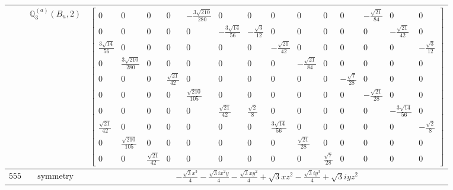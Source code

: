 \documentclass[fleqn,8pt,landscape]{jsarticle}
\begin{document}
\begin{longtable}{ccc}
$  $ & $ \mathbb{Q}_{3}^{(a)}(B_{u},2) $ & $ \begin{bmatrix} 0 & 0 & 0 & 0 & - \frac{3 \sqrt{210}}{280} & 0 & 0 & 0 & 0 & 0 & 0 & - \frac{\sqrt{21}}{84} & 0 & 0 \\ 0 & 0 & 0 & 0 & 0 & - \frac{3 \sqrt{14}}{56} & - \frac{\sqrt{3}}{12} & 0 & 0 & 0 & 0 & 0 & - \frac{\sqrt{21}}{42} & 0 \\ \frac{3 \sqrt{14}}{56} & 0 & 0 & 0 & 0 & 0 & 0 & - \frac{\sqrt{21}}{42} & 0 & 0 & 0 & 0 & 0 & - \frac{\sqrt{3}}{12} \\ 0 & \frac{3 \sqrt{210}}{280} & 0 & 0 & 0 & 0 & 0 & 0 & - \frac{\sqrt{21}}{84} & 0 & 0 & 0 & 0 & 0 \\ 0 & 0 & 0 & \frac{\sqrt{21}}{42} & 0 & 0 & 0 & 0 & 0 & 0 & - \frac{\sqrt{7}}{28} & 0 & 0 & 0 \\ 0 & 0 & 0 & 0 & \frac{\sqrt{210}}{105} & 0 & 0 & 0 & 0 & 0 & 0 & - \frac{\sqrt{21}}{28} & 0 & 0 \\ 0 & 0 & 0 & 0 & 0 & \frac{\sqrt{21}}{42} & \frac{\sqrt{2}}{8} & 0 & 0 & 0 & 0 & 0 & - \frac{3 \sqrt{14}}{56} & 0 \\ \frac{\sqrt{21}}{42} & 0 & 0 & 0 & 0 & 0 & 0 & \frac{3 \sqrt{14}}{56} & 0 & 0 & 0 & 0 & 0 & - \frac{\sqrt{2}}{8} \\ 0 & \frac{\sqrt{210}}{105} & 0 & 0 & 0 & 0 & 0 & 0 & \frac{\sqrt{21}}{28} & 0 & 0 & 0 & 0 & 0 \\ 0 & 0 & \frac{\sqrt{21}}{42} & 0 & 0 & 0 & 0 & 0 & 0 & \frac{\sqrt{7}}{28} & 0 & 0 & 0 & 0 \end{bmatrix} $ \\ \hline
$ 555 $ & $ \text{symmetry} $ & $ - \frac{\sqrt{3} x^{3}}{4} - \frac{\sqrt{3} i x^{2} y}{4} - \frac{\sqrt{3} x y^{2}}{4} + \sqrt{3} x z^{2} - \frac{\sqrt{3} i y^{3}}{4} + \sqrt{3} i y z^{2} $ \\

\end{longtable}
\end{document}
